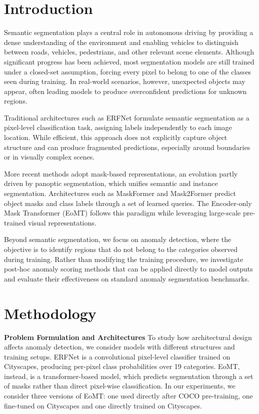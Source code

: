 \documentclass[10pt,twocolumn,letterpaper]{article}
\begin{document}
\section{Introduction}

Semantic segmentation plays a central role in autonomous driving by providing a dense understanding of the environment and enabling vehicles to distinguish between roads, vehicles, pedestrians, and other relevant scene elements. Although significant progress has been achieved, most segmentation models are still trained under a closed-set assumption, forcing every pixel to belong to one of the classes seen during training. In real-world scenarios, however, unexpected objects may appear, often leading models to produce overconfident predictions for unknown regions.

Traditional architectures such as ERFNet formulate semantic segmentation as a pixel-level classification task, assigning labels independently to each image location. While efficient, this approach does not explicitly capture object structure and can produce fragmented predictions, especially around boundaries or in visually complex scenes.

More recent methods adopt mask-based representations, an evolution partly driven by panoptic segmentation, which unifies semantic and instance segmentation. Architectures such as MaskFormer and Mask2Former predict object masks and class labels through a set of learned queries. The Encoder-only Mask Transformer (EoMT) follows this paradigm while leveraging large-scale pre-trained visual representations.

Beyond semantic segmentation, we focus on anomaly detection, where the objective is to identify regions that do not belong to the categories observed during training. Rather than modifying the training procedure, we investigate post-hoc anomaly scoring methods that can be applied directly to model outputs and evaluate their effectiveness on standard anomaly segmentation benchmarks.


\section{Methodology}

\textbf{Problem Formulation and Architectures}
To study how architectural design affects anomaly detection, we consider models with different structures and training setups. ERFNet is a convolutional pixel-level classifier trained on Cityscapes, producing per-pixel class probabilities over 19 categories. EoMT, instead, is a transformer-based model, which predicts segmentation through a set of masks rather than direct pixel-wise classification. In our experiments, we consider three versions of EoMT: one used directly after COCO pre-training, one fine-tuned on Cityscapes and one directly trained on Cityscapes.
\end{document}
